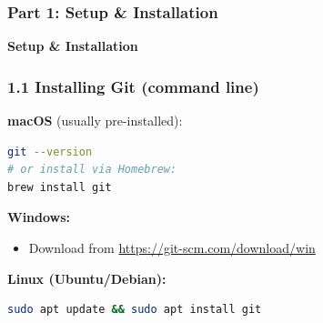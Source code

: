 \documentclass{beamer}
\begin{document}


\begin{frame}
\frametitle{Part 1: Setup \& Installation}
\centering
\Large \textbf{Setup \& Installation}\\[6pt]
\end{frame}

\begin{frame}[fragile]
\frametitle{1.1 Installing Git (command line)}

\textbf{macOS} (usually pre-installed):
\begin{lstlisting}[language=bash]
git --version
# or install via Homebrew:
brew install git
\end{lstlisting}

\textbf{Windows:}
\begin{itemize}
    \item Download from \url{https://git-scm.com/download/win}
\end{itemize}

\textbf{Linux (Ubuntu/Debian):}
\begin{lstlisting}[language=bash]
sudo apt update && sudo apt install git
\end{lstlisting}
\end{frame}

\end{document}
